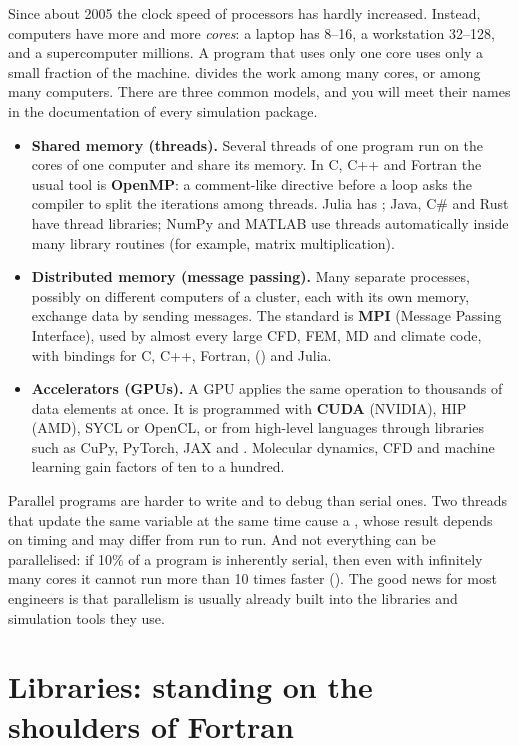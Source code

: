 Since about 2005 the clock speed of processors has hardly increased. Instead, computers
have more and more \emph{cores}: a laptop has 8--16, a workstation 32--128, and a
supercomputer millions. A program that uses only one core uses only a small fraction of the
machine.  divides the work among many cores, or among many
computers. There are three common models, and you will meet their names in the
documentation of every simulation package.
\begin{itemize}
\item \textbf{Shared memory (threads).} Several threads of one program run on the cores of
  one computer and share its memory. In C, C++ and Fortran the usual tool is
  \textbf{OpenMP}: a comment-like directive before a loop asks the compiler to split the
  iterations among threads. Julia has ; Java, C\# and Rust have
  thread libraries; NumPy and MATLAB use threads automatically inside many library routines
  (for example, matrix multiplication).
\item \textbf{Distributed memory (message passing).} Many separate processes, possibly on
  different computers of a cluster, each with its own memory, exchange data by sending
  messages. The standard is \textbf{MPI} (Message Passing Interface), used by almost every
  large CFD, FEM, MD and climate code, with bindings for C, C++, Fortran, \py
  () and Julia.
\item \textbf{Accelerators (GPUs).} A GPU applies the same operation to thousands of data
  elements at once. It is programmed with \textbf{CUDA} (NVIDIA), HIP (AMD), SYCL or OpenCL,
  or from high-level languages through libraries such as CuPy, PyTorch, JAX and
  . Molecular dynamics, CFD and machine learning gain factors of ten to a
  hundred.
\end{itemize}
Parallel programs are harder to write and to debug than serial ones. Two threads that
update the same variable at the same time cause a , whose result
depends on timing and may differ from run to run. And not everything can be parallelised:
if 10\% of a program is inherently serial, then even with infinitely many cores it cannot
run more than 10 times faster (). The good news for most engineers is
that parallelism is usually already built into the libraries and simulation tools they use.

\section{Libraries: standing on the shoulders of Fortran}

